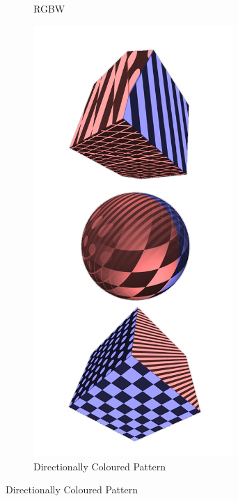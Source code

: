 \documentclass{l4proj}
\begin{document}
\begin{figure}[H]
\begin{subfigure}[b]{0.25\textwidth}
    \caption{
      RGBW
    }
    \label{fig:tex1}
  \end{subfigure}
  \hspace{1cm}
  \begin{subfigure}[b]{0.30\textwidth}
    \includegraphics[width=0.83\textwidth]{images/textures/pattern-direction.png}
    \caption{
      Directionally Coloured Pattern
    }
    \label{fig:tex2}
  \end{subfigure}
  \hspace{0.5cm}

\end{figure}
\end{document}
